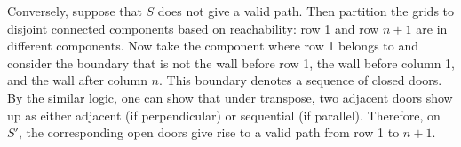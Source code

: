 \documentclass[11pt,a4paper]{article}
\begin{document}
    Conversely, suppose that $S$ does not give a valid path. Then partition the grids to disjoint connected components based on reachability: row 1 and row $n+1$ are in different components. 
    Now take the component where row 1 belongs to and consider the boundary that is not the wall before row 1, 
    the wall before column 1, and the wall after column $n$. 
    This boundary denotes a sequence of closed doors. 
    By the similar logic, one can show that under transpose, two adjacent doors show up as either adjacent (if perpendicular) or sequential (if parallel). 
    Therefore, on $S'$, 
    the corresponding open doors give rise to a valid path from row 1 to $n + 1$. 
    
	
\end{document}

